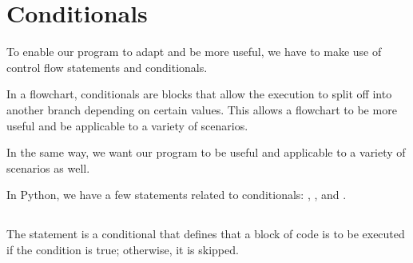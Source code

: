 \documentclass[letterpaper,10pt,english]{jupyterBook}
\begin{document}
\sphinxstepscope


\chapter{Conditionals}
\label{\detokenize{conditionals:conditionals}}\label{\detokenize{conditionals::doc}}
\sphinxAtStartPar
To enable our program to adapt and be more useful, we have to make use of control flow statements and conditionals.

\sphinxAtStartPar
In a flowchart, conditionals are blocks that allow the execution to split off into another branch depending on certain values.
This allows a flowchart to be more useful and be applicable to a variety of scenarios.

\sphinxAtStartPar
In the same way, we want our program to be useful and applicable to a variety of scenarios as well.

\sphinxAtStartPar
In Python, we have a few statements related to conditionals: , , and .


\section{}
\label{\detokenize{conditionals:if}}
\sphinxAtStartPar
The  statement is a conditional that defines that a block of code is to be executed if the condition is true; otherwise, it is skipped.
\end{document}
